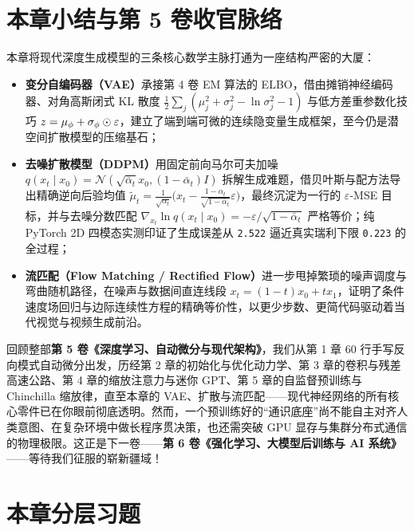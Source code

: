 \section*{本章小结与第 5 卷收官脉络}

本章将现代深度生成模型的三条核心数学主脉打通为一座结构严密的大厦：
\begin{itemize}
  \item \textbf{变分自编码器（VAE）}承接第 4 卷 EM 算法的 ELBO，借由摊销神经编码器、对角高斯闭式 KL 散度 $\frac{1}{2}\sum_j(\mu_j^2 + \sigma_j^2 - \ln\sigma_j^2 - 1)$ 与低方差重参数化技巧 $z = \mu_\phi + \sigma_\phi \odot \varepsilon$，建立了端到端可微的连续隐变量生成框架，至今仍是潜空间扩散模型的压缩基石；
  \item \textbf{去噪扩散模型（DDPM）}用固定前向马尔可夫加噪 $q(x_t \mid x_0) = \mathcal{N}(\sqrt{\bar{\alpha}_t}x_0, (1-\bar{\alpha}_t)I)$ 拆解生成难题，借贝叶斯与配方法导出精确逆向后验均值 $\tilde{\mu}_t = \frac{1}{\sqrt{\alpha_t}}\big(x_t - \frac{1-\alpha_t}{\sqrt{1-\bar{\alpha}_t}}\varepsilon\big)$，最终沉淀为一行的 $\varepsilon$-MSE 目标，并与去噪分数匹配 $\nabla_{x_t}\ln q(x_t \mid x_0) = -\varepsilon / \sqrt{1-\bar{\alpha}_t}$ 严格等价；纯 PyTorch 2D 四模态实测印证了生成误差从 \texttt{2.522} 逼近真实瑞利下限 \texttt{0.223} 的全过程；
  \item \textbf{流匹配（Flow Matching / Rectified Flow）}进一步甩掉繁琐的噪声调度与弯曲随机路径，在噪声与数据间直连线段 $x_t = (1-t)x_0 + t x_1$，证明了条件速度场回归与边际连续性方程的精确等价性，以更少步数、更简代码驱动着当代视觉与视频生成前沿。
\end{itemize}

回顾整部\textbf{第 5 卷《深度学习、自动微分与现代架构》}，我们从第 1 章 60 行手写反向模式自动微分出发，历经第 2 章的初始化与优化动力学、第 3 章的卷积与残差高速公路、第 4 章的缩放注意力与迷你 GPT、第 5 章的自监督预训练与 Chinchilla 缩放律，直至本章的 VAE、扩散与流匹配——现代神经网络的所有核心零件已在你眼前彻底透明。然而，一个预训练好的“通识底座”尚不能自主对齐人类意图、在复杂环境中做长程序贯决策，也还需突破 GPU 显存与集群分布式通信的物理极限。这正是下一卷——\textbf{第 6 卷《强化学习、大模型后训练与 AI 系统》}——等待我们征服的崭新疆域！

\section*{本章分层习题}


